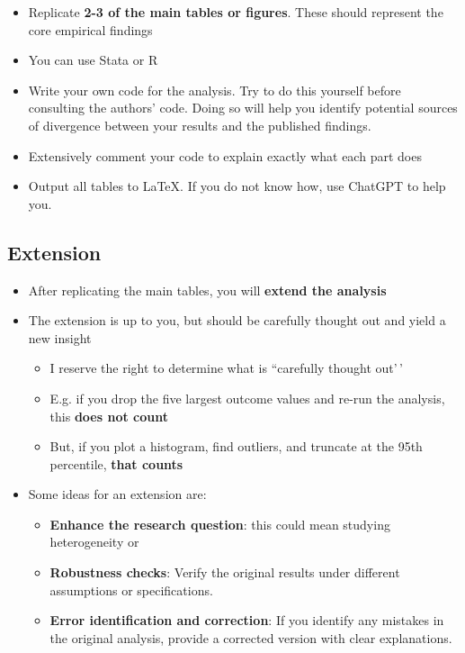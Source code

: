 \documentclass[
]{article}
\providecommand{\tightlist}{%
  \setlength{\itemsep}{0pt}\setlength{\parskip}{0pt}}
\begin{document}
\begin{itemize}
\tightlist
\item
  Replicate \textbf{2-3 of the main tables or figures}. These should represent the core empirical findings
\item
  You can use Stata or R
\item
  Write your own code for the analysis. Try to do this yourself before consulting the authors' code. Doing so will help you identify potential sources of divergence between your results and the published findings.
\item
  Extensively comment your code to explain exactly what each part does
\item
  Output all tables to LaTeX. If you do not know how, use ChatGPT to help you.
\end{itemize}

\hypertarget{extension}{%
\subsection{Extension}\label{extension}}

\begin{itemize}
\tightlist
\item
  After replicating the main tables, you will \textbf{extend the analysis}
\item
  The extension is up to you, but should be carefully thought out and yield a new insight

  \begin{itemize}
  \tightlist
  \item
    I reserve the right to determine what is ``carefully thought out'\,'
  \item
    E.g. if you drop the five largest outcome values and re-run the analysis, this \textbf{does not count}
  \item
    But, if you plot a histogram, find outliers, and truncate at the 95th percentile, \textbf{that counts}
  \end{itemize}
\item
  Some ideas for an extension are:

  \begin{itemize}
  \tightlist
  \item
    \textbf{Enhance the research question}: this could mean studying heterogeneity or
  \item
    \textbf{Robustness checks}: Verify the original results under different assumptions or specifications.
  \item
    \textbf{Error identification and correction}: If you identify any mistakes in the original analysis, provide a corrected version with clear explanations.
  \end{itemize}
\end{itemize}
\end{document}
